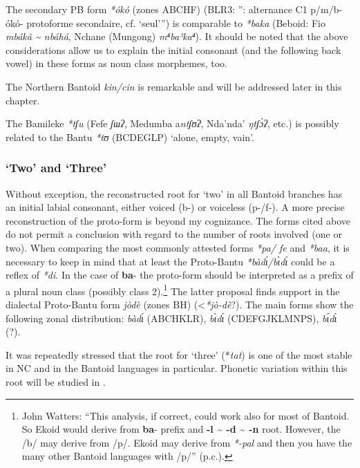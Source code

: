 The secondary PB form \textit{*ókó} (zones ABCHF) (BLR3: ''\citealt{Janssens1994}: alternance C1 p/m/b-ókó- protoforme secondaire, cf. `seul'”) is comparable to \textit{*baka} (Beboid: Fio \textit{mbákâ {\textasciitilde} nbáhá}, Nchane (Mungong) \textit{m⁴ba³ka⁴}). It should be noted that the above considerations allow us to explain the initial consonant (and the following back vowel) in these forms as noun class morphemes, too. 

The Northern Bantoid \textit{kin/cin} is remarkable and will be addressed later in this chapter. 

The Bamileke \textit{*tʃu} (Fefe \textit{ʃɯ}\textit{ʔ}, Medumba a\textit{ntʃʊ}\textit{ʔ}, Nda'nda' \textit{ŋtʃ{\`{ɔ}}ʔ}, etc.) is possibly related to the Bantu \textit{*tʊ} (BCDEGLP) ‘alone, empty, vain’. 

 
\subsubsection{‘Two’ and ‘Three’} %


Without exception, the reconstructed root for `two' in all Bantoid branches has an initial labial consonant, either voiced (b-) or voiceless (p-/f-). A more precise reconstruction of the proto-form is beyond my cognizance. The forms cited above do not permit a conclusion with regard to the number of roots involved (one or two). When comparing the most commonly attested forms \textit{*pa/ fe} and \textit{*baa}, it is necessary to keep in mind that at least the Proto-Bantu \textit{*bàd{\'{ɩ}}/b{\`{ɩ}}d{\'{ɩ}}} could be a reflex of \textit{*di}. In the case of \textbf{ba}- the proto-form should be interpreted as a prefix of a plural noun class (possibly class 2).\footnote{John Watters: “This analysis, if correct, could work also for most of Bantoid. So Ekoid would derive from \textbf{ba}- prefix and \textbf{-l {\textasciitilde} -d {\textasciitilde} -n} root. However, the /b/ may derive from /p/. Ekoid may derive from \textit{*-pal} and then you have the many other Bantoid languages with /p/” (p.c.).} The latter proposal finds support in the dialectal Proto-Bantu form \textit{jòdè} (zones BH) (<\textit{*jò-dè}?). The main forms show the following zonal distribution: \textit{bàd{\'{ɩ}}} (ABCHKLR), \textit{b{\`{ɩ}}d{\'{ɩ}}} (CDEFGJKLMNPS), \textit{b{\'{ɩ}}d{\`{ɩ}}} (?).

  It was repeatedly stressed that the root for `three' (*\textit{tat}) is one of the most stable in NC and in the Bantoid languages in particular. Phonetic variation within this root will be studied in . 

